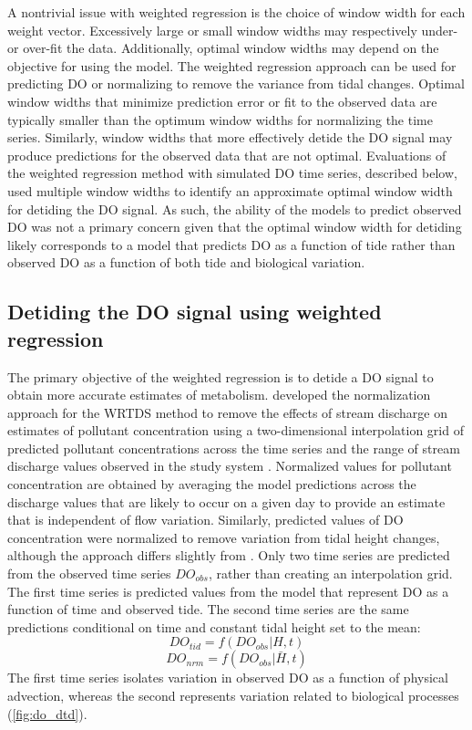 \documentclass[letterpaper,12pt,oneside]{article}\usepackage[]{graphicx}\usepackage[]{color}
\begin{document}
A nontrivial issue with weighted regression is the choice of window width for each weight vector.  Excessively large or small window widths may respectively under- or over-fit the data.  Additionally, optimal window widths may depend on the objective for using the model.  The weighted regression approach can be used for predicting \ac{DO} or normalizing to remove the variance from tidal changes.  Optimal window widths that minimize prediction error or fit to the observed data are typically smaller than the optimum window widths for normalizing the time series.  Similarly, window widths that more effectively detide the \ac{DO} signal may produce predictions for the observed data that are not optimal.  Evaluations of the weighted regression method with simulated \ac{DO} time series, described below, used multiple window widths to identify an approximate optimal window width for detiding the \ac{DO} signal.  As such, the ability of the models to predict observed \ac{DO} was not a primary concern given that the optimal window width for detiding likely corresponds to a model that predicts \ac{DO} as a function of tide rather than observed \ac{DO} as a function of both tide and biological variation.  

\subsection{Detiding the \ac{DO} signal using weighted regression}

The primary objective of the weighted regression is to detide a \ac{DO} signal to obtain more accurate estimates of metabolism.  \citet{Hirsch10} developed the normalization approach for the \ac{WRTDS} method to remove the effects of stream discharge on estimates of pollutant concentration using a two-dimensional interpolation grid of predicted pollutant concentrations across the time series and the range of stream discharge values observed in the study system \citep{Hirsch10}.  Normalized values for pollutant concentration are obtained by averaging the model predictions across the discharge values that are likely to occur on a given day to provide an estimate that is independent of flow variation.  Similarly, predicted values of \ac{DO} concentration were normalized to remove variation from tidal height changes, although the approach differs slightly from \citet{Hirsch10}.  Only two time series are predicted from the observed time series $DO_{obs}$, rather than creating an interpolation grid.  The first time series is predicted values from the model that represent \ac{DO} as a function of time and observed tide.  The second time series are the same predictions conditional on time and constant tidal height set to the mean:
\begin{equation} \label{do_tid}
DO_{tid} = f(DO_{obs}|H, t)
\end{equation}
\begin{equation} \label{do_nrm}
DO_{nrm} = f(DO_{obs}|\bar{H}, t)
\end{equation}
The first time series isolates variation in observed \ac{DO} as a function of physical advection, whereas the second represents variation related to biological processes (\cref{fig:do_dtd}).   
\end{document}
